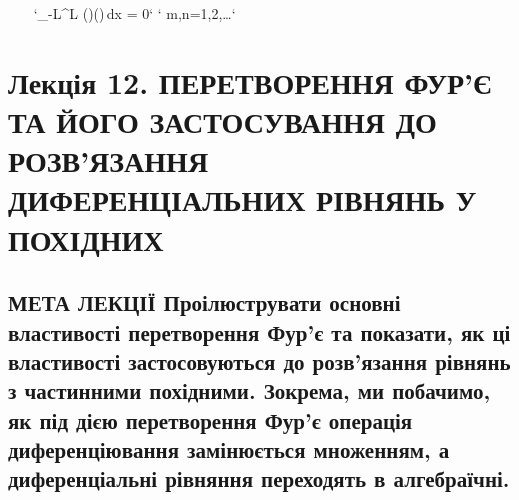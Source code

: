 \documentclass[
  ukrainian,
]{article}
\begin{document}
~~~
`\int_{-L}^{L} \sin\!\left(\right)\cos\!\left(\right)\,dx = 0`
`\quad {} m,n=1,2,\dots`
~~~

\section{Лекція 12. ПЕРЕТВОРЕННЯ ФУР'Є ТА ЙОГО ЗАСТОСУВАННЯ ДО
РОЗВ'ЯЗАННЯ ДИФЕРЕНЦІАЛЬНИХ РІВНЯНЬ У
ПОХІДНИХ}\label{ux43bux435ux43aux446ux456ux44f-12.-ux43fux435ux440ux435ux442ux432ux43eux440ux435ux43dux43dux44f-ux444ux443ux440ux454-ux442ux430-ux439ux43eux433ux43e-ux437ux430ux441ux442ux43eux441ux443ux432ux430ux43dux43dux44f-ux434ux43e-ux440ux43eux437ux432ux44fux437ux430ux43dux43dux44f-ux434ux438ux444ux435ux440ux435ux43dux446ux456ux430ux43bux44cux43dux438ux445-ux440ux456ux432ux43dux44fux43dux44c-ux443-ux43fux43eux445ux456ux434ux43dux438ux445}

\subsection{МЕТА ЛЕКЦІЇ Проілюструвати основні властивості перетворення
Фур'є та показати, як ці властивості застосовуються до розв'язання
рівнянь з частинними похідними. Зокрема, ми побачимо, як під дією
перетворення Фур'є операція диференціювання замінюється множенням, а
диференціальні рівняння переходять в
алгебраїчні.}\label{ux43cux435ux442ux430-ux43bux435ux43aux446ux456ux457-ux43fux440ux43eux456ux43bux44eux441ux442ux440ux443ux432ux430ux442ux438-ux43eux441ux43dux43eux432ux43dux456-ux432ux43bux430ux441ux442ux438ux432ux43eux441ux442ux456-ux43fux435ux440ux435ux442ux432ux43eux440ux435ux43dux43dux44f-ux444ux443ux440ux454-ux442ux430-ux43fux43eux43aux430ux437ux430ux442ux438-ux44fux43a-ux446ux456-ux432ux43bux430ux441ux442ux438ux432ux43eux441ux442ux456-ux437ux430ux441ux442ux43eux441ux43eux432ux443ux44eux442ux44cux441ux44f-ux434ux43e-ux440ux43eux437ux432ux44fux437ux430ux43dux43dux44f-ux440ux456ux432ux43dux44fux43dux44c-ux437-ux447ux430ux441ux442ux438ux43dux43dux438ux43cux438-ux43fux43eux445ux456ux434ux43dux438ux43cux438.-ux437ux43eux43aux440ux435ux43cux430-ux43cux438-ux43fux43eux431ux430ux447ux438ux43cux43e-ux44fux43a-ux43fux456ux434-ux434ux456ux454ux44e-ux43fux435ux440ux435ux442ux432ux43eux440ux435ux43dux43dux44f-ux444ux443ux440ux454-ux43eux43fux435ux440ux430ux446ux456ux44f-ux434ux438ux444ux435ux440ux435ux43dux446ux456ux44eux432ux430ux43dux43dux44f-ux437ux430ux43cux456ux43dux44eux454ux442ux44cux441ux44f-ux43cux43dux43eux436ux435ux43dux43dux44fux43c-ux430-ux434ux438ux444ux435ux440ux435ux43dux446ux456ux430ux43bux44cux43dux456-ux440ux456ux432ux43dux44fux43dux43dux44f-ux43fux435ux440ux435ux445ux43eux434ux44fux442ux44c-ux432-ux430ux43bux433ux435ux431ux440ux430ux457ux447ux43dux456.}
\end{document}
